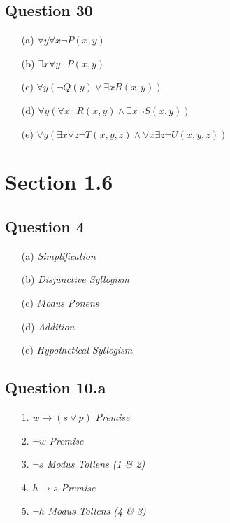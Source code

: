 \documentclass{article}
\begin{document}
\subsection*{Question 30}
\begin{itemize}
    \item[(a)] \(\forall y \forall x \neg P(x, y)\)
    \item[(b)] \(\exists x \forall y \neg P(x, y)\)
    \item[(c)] \(\forall y (\neg Q(y) \lor \exists x R(x, y))\)
    \item[(d)] \(\forall y (\forall x \neg R(x, y) \land \exists x \neg S(x, y))\)
    \item[(e)] \(\forall y (\exists x \forall z \neg T(x, y, z) \land \forall x \exists z \neg U(x, y, z))\)
\end{itemize}

\section*{Section 1.6}

\subsection*{Question 4}
\begin{itemize}
    \item[(a)] \textit{Simplification}\\
    \item[(b)] \textit{Disjunctive Syllogism}\\
    \item[(c)] \textit{Modus Ponens}\\
    \item[(d)] \textit{Addition}\\
    \item[(e)] \textit{Hypothetical Syllogism}\\
\end{itemize}

\subsection*{Question 10.a}
\begin{itemize}
    \item[1.] \( w \rightarrow (s \lor p) \) \hfill \textit{Premise}
    \item[2.] \( \neg w \) \hfill \textit{Premise}
    \item[3.] \( \neg s \) \hfill \textit{Modus Tollens (1 \& 2)}
    \item[4.] \( h \rightarrow s \) \hfill \textit{Premise}
    \item[5.] \( \neg h \) \hfill \textit{Modus Tollens (4 \& 3)}
\end{itemize}
\end{document}
